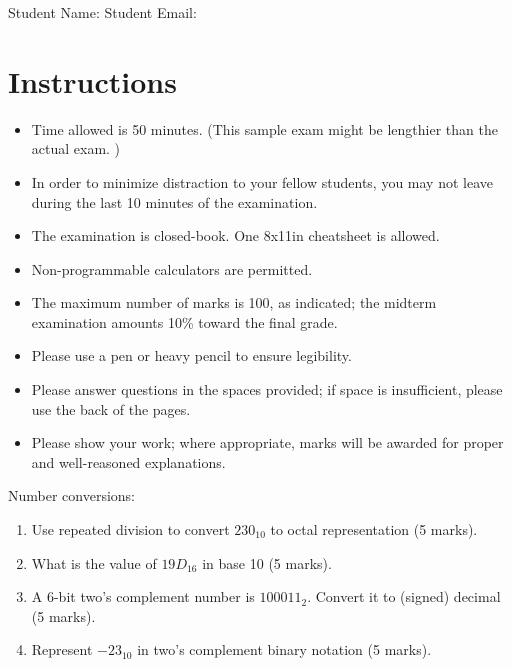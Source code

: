 
\maketitle

Student Name: \hfill Student Email: \hspace{10em}
\section{Instructions}
\begin{itemize}
  \item Time allowed is 50 minutes. (This sample exam might be lengthier than the actual exam. )
  \item In order to minimize distraction to your fellow students, you may not leave
  during the last 10 minutes of the examination.
  \item The examination is closed-book. One 8x11in cheatsheet is allowed.
  \item Non-programmable calculators are permitted.
  \item The maximum number of marks is 100, as indicated; the midterm examination
  amounts 10\% toward the final grade.
  \item Please use a pen or heavy pencil to ensure legibility.
  \item Please answer questions in the spaces provided; if space is insufficient, please
  use the back of the pages.
  \item Please show your work; where appropriate, marks will be awarded for proper and well-reasoned explanations.
\end{itemize}

\begin{prob}
  Number conversions:
  \begin{enumerate}
    \item Use repeated division to convert $230_{10}$ to octal representation (5 marks).
    \item What is the value of $19D_{16}$ in base 10 (5 marks).
    \item A 6-bit two's complement number is $100011_{2}$. Convert it to (signed) decimal (5 marks).
    \item Represent $-23_{10}$ in two's complement binary notation (5 marks).
  \end{enumerate}
\end{prob}

